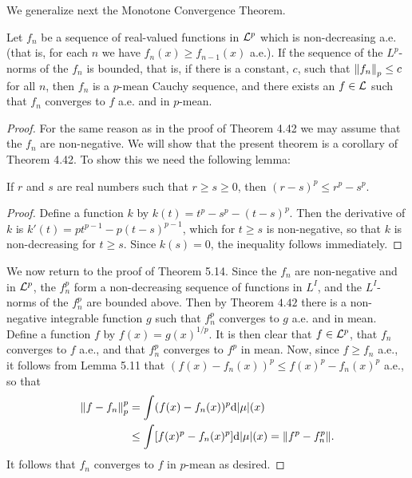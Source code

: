 We generalize next the Monotone Convergence Theorem.

\begin{theorem}
Let $f_n$ be a sequence of real-valued functions in ${\cal L}^p$ which is non-decreasing a.e. (that is, for each $n$ we have $f_n(x)\geq f_{n-1}(x)$ a.e.). If the sequence of the $L^p$-norms of the $f_n$ is bounded, that is, if there is a constant, $c$, such that $\norm{f_n}_p\leq c$ for all $n$, then $f_n$ is a $p$-mean Cauchy sequence, and there exists an $f\in{\cal L}$ such that $f_n$ converges to $f$ a.e. and in $p$-mean.
\end{theorem}

\begin{proof}
For the same reason as in the proof of Theorem 4.42 we may assume that the $f_n$ are non-negative. We will show that the present theorem is a corollary of Theorem 4.42. To show this we need the following lemma:

\begin{lemma}
If $r$ and $s$ are real numbers such that $r\geq s\geq 0$, then $(r-s)^p\leq r^p-s^p$.
\end{lemma}

\begin{proof}
Define a function $k$ by $k(t)=t^p-s^p-(t-s)^p$. Then the derivative of $k$ is $k'(t)=pt^{p-1}-p(t-s)^{p-1}$, which for $t\geq s$ is non-negative, so that $k$ is non-decreasing for $t\geq s$. Since $k(s)=0$, the inequality follows immediately.
\end{proof}

We now return to the proof of Theorem 5.14. Since the $f_n$ are non-negative and in ${\cal L}^p$, the $f_n^p$ form a non-decreasing sequence of functions in $L^I$, and the $L^I$-norms of the $f_n^p$ are bounded above. Then by Theorem $4.42$ there is a non-negative integrable function $g$ such that $f_n^p$ converges to $g$ a.e. and in mean. Define a function $f$ by $f(x)=g(x)^{1/p}$. It is then clear that $f\in{\cal L}^p$, that $f_n$ converges to $f$ a.e., and that $f_n^p$ converges to $f^p$ in mean. Now, since $f \geq f_n$ a.e., it follows from Lemma 5.11 that $(f(x)-f_n(x))^p\leq f(x)^p-f_n(x)^p$ a.e., so that
\begin{align*}
    \norm{f-f_n}_p^p&=\int(f(x)-f_n(x))^p\dd|\mu|(x) \\
    &\leq\int[f(x)^p-f_n(x)^p]\dd|\mu|(x)=\norm{f^p-f_n^p}.
\end{align*}
It follows that $f_n$ converges to $f$ in $p$-mean as desired.
\end{proof}

